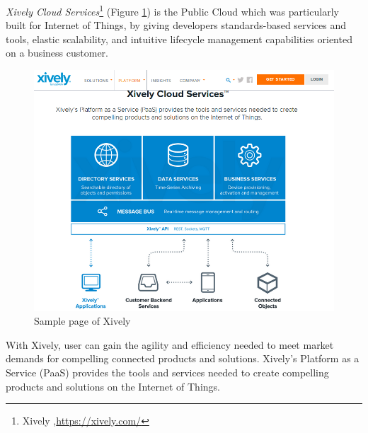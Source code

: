     \emph{Xively Cloud Services}\footnote{Xively ,\url{https://xively.com/}} (Figure \ref{img:xively}) is the Public Cloud which was particularly built for Internet of Things, by giving developers standards-based services and tools, elastic scalability, and intuitive lifecycle management capabilities oriented on a business customer. 
        \begin{figure}[!ht]
		\centering
		\includegraphics[scale=0.5]{Material/examples/Xively.png}   
		\caption[Sample page of Xively]{Sample page of Xively}    
		\label{img:xively}              
		\end{figure} 
	With Xively, user can gain the agility and efficiency needed to meet market demands for compelling connected products and solutions. Xively's Platform as a Service (PaaS) provides the tools and services needed to create compelling products and solutions on the Internet of Things.


